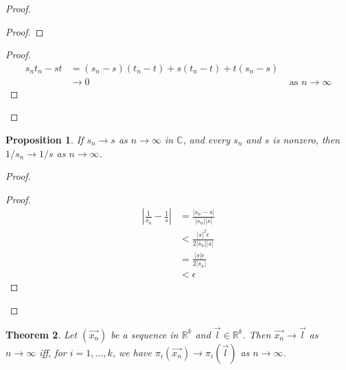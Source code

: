 \documentclass{book}
\let\qed\relax
\newtheorem{prop}{Proposition}[chapter]
\newtheorem{thm}[prop]{Theorem}
\theoremstyle{definition}
\begin{document}
\begin{proof}
\pf
{}
\begin{proof}
\end{proof}
\begin{proof}
	\pf
	\begin{align*}
		s_n t_n - st & = (s_n - s)(t_n - t) + s(t_n - t) + t(s_n - s) \\
		& \rightarrow 0 & \text{ as } n \rightarrow \infty
	\end{align*}
\end{proof}
\qed
\end{proof}

\begin{prop}
\label{prop:limit_of_inverse}
If $s_n \rightarrow s$ as $n \rightarrow \infty$ in $\mathbb{C}$, and every $s_n$ and $s$ is nonzero, then $1/s_n \rightarrow 1/s$ as $n \rightarrow \infty$.
\end{prop}

\begin{proof}
\pf
{}
\begin{proof}
	\pf
	\begin{align*}
		\left| \frac{1}{s_n} - \frac{1}{s} \right|
		& = \frac{|s_n - s|}{|s_n||s|} \\
		& < \frac{|s|^2 \epsilon}{2 |s_n| |s|} \\
		& = \frac{|s| \epsilon}{2 |s_n|} \\
		& < \epsilon
	\end{align*}
\end{proof}
\qed
\end{proof}

\begin{thm}
Let $(\vec{x_n})$ be a sequence in $\mathbb{R}^k$ and $\vec{l} \in \mathbb{R}^k$. Then $\vec{x_n} \rightarrow \vec{l}$ as $n \rightarrow \infty$ iff, for $i = 1, \ldots, k$, we have $\pi_i(\vec{x_n}) \rightarrow \pi_i(\vec{l})$ as $n \rightarrow \infty$.
\end{thm}
\end{document}
